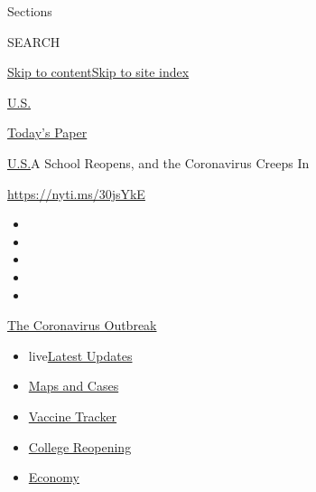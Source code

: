 Sections

SEARCH

\protect\hyperlink{site-content}{Skip to
content}\protect\hyperlink{site-index}{Skip to site index}

\href{https://www.nytimes3xbfgragh.onion/section/us}{U.S.}

\href{https://myaccount.nytimes3xbfgragh.onion/auth/login?response_type=cookie\&client_id=vi}{}

\href{https://www.nytimes3xbfgragh.onion/section/todayspaper}{Today's
Paper}

\href{/section/us}{U.S.}\textbar{}A School Reopens, and the Coronavirus
Creeps In

\url{https://nyti.ms/30jsYkE}

\begin{itemize}
\item
\item
\item
\item
\item
\end{itemize}

\href{https://www.nytimes3xbfgragh.onion/news-event/coronavirus?action=click\&pgtype=Article\&state=default\&region=TOP_BANNER\&context=storylines_menu}{The
Coronavirus Outbreak}

\begin{itemize}
\tightlist
\item
  live\href{https://www.nytimes3xbfgragh.onion/2020/08/04/world/coronavirus-cases.html?action=click\&pgtype=Article\&state=default\&region=TOP_BANNER\&context=storylines_menu}{Latest
  Updates}
\item
  \href{https://www.nytimes3xbfgragh.onion/interactive/2020/us/coronavirus-us-cases.html?action=click\&pgtype=Article\&state=default\&region=TOP_BANNER\&context=storylines_menu}{Maps
  and Cases}
\item
  \href{https://www.nytimes3xbfgragh.onion/interactive/2020/science/coronavirus-vaccine-tracker.html?action=click\&pgtype=Article\&state=default\&region=TOP_BANNER\&context=storylines_menu}{Vaccine
  Tracker}
\item
  \href{https://www.nytimes3xbfgragh.onion/2020/08/02/us/covid-college-reopening.html?action=click\&pgtype=Article\&state=default\&region=TOP_BANNER\&context=storylines_menu}{College
  Reopening}
\item
  \href{https://www.nytimes3xbfgragh.onion/live/2020/08/04/business/stock-market-today-coronavirus?action=click\&pgtype=Article\&state=default\&region=TOP_BANNER\&context=storylines_menu}{Economy}
\end{itemize}

